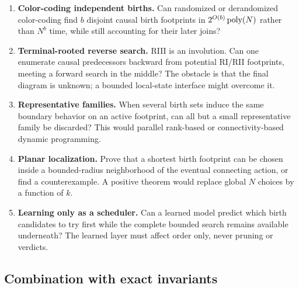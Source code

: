 \begin{enumerate}[label=\textbf{Q\arabic*.},resume]
\item \textbf{Color-coding independent births.}
      Can randomized or derandomized color-coding find $b$ disjoint causal birth
      footprints in $2^{O(b)}\operatorname{poly}(N)$ rather than $N^b$ time, while still
      accounting for their later joins?

\item \textbf{Terminal-rooted reverse search.}
      RIII is an involution.  Can one enumerate causal predecessors backward
      from potential RI/RII footprints, meeting a forward search in the middle?
      The obstacle is that the final diagram is unknown; a bounded local-state
      interface might overcome it.

\item \textbf{Representative families.}
      When several birth sets induce the same boundary behavior on an active
      footprint, can all but a small representative family be discarded?  This
      would parallel rank-based or connectivity-based dynamic programming.

\item \textbf{Planar localization.}
      Prove that a shortest birth footprint can be chosen inside a bounded-radius
      neighborhood of the eventual connecting action, or find a counterexample.
      A positive theorem would replace global $N$ choices by a function of $k$.

\item \textbf{Learning only as a scheduler.}
      Can a learned model predict which birth candidates to try first while the
      complete bounded search remains available underneath?  The learned layer
      must affect order only, never pruning or verdicts.
\end{enumerate}

\subsection{Combination with exact invariants}

